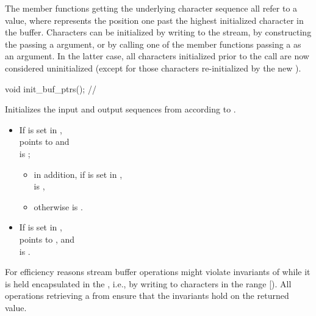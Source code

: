 \documentclass[ebook,11pt,article]{memoir}
\begin{document}
\begin{addedblock}
\pnum
The member functions getting the underlying character sequence all refer to a  value, 
 where
 represents the position one past the highest initialized character
in the buffer. Characters can be initialized by writing to the stream, by constructing
the  passing a  argument, or by calling one of 
the
 member functions passing a  as an argument. 
In the latter case, all characters initialized prior to
the call are now considered uninitialized (except for those characters re-initialized
by the new ).  

\begin{itemdecl}
void init_buf_ptrs(); // \expos
\end{itemdecl}
\begin{itemdescr}
\pnum
\effects 
Initializes the input and output sequences from  according to .

\pnum
\ensures
\begin{itemize}
\item If  is set in ,\\ 
 points to  and \\ is ; 
\begin{itemize}
\item in addition, if  is set in , \\
 is , 
\item otherwise  is . 
\end{itemize}
\item If  is set in , \\
 points to , 
and \\ \tcode{\&\&}  is .
\end{itemize}

\pnum
\begin{note}
For efficiency reasons stream buffer operations might violate invariants of  while it is held encapsulated in the , i.e., by writing to characters in the range [). All operations retrieving a  from  ensure that the  invariants hold on the returned value.
\end{note}
\end{itemdescr}
\end{addedblock}
\end{document}

